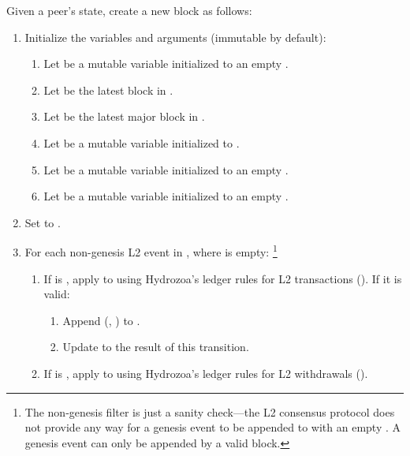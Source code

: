 \documentclass[../hydrozoa.tex]{subfiles}
\begin{document}
Given a peer's state, create a new block as follows:
\begin{enumerate}
  \item Initialize the variables and arguments (immutable by default):
    \begin{enumerate}
      \item Let  be a mutable variable initialized to an empty .
      \item Let  be the latest block in .
      \item Let  be the latest major block in .
      \item Let  be a mutable variable initialized to .
      \item Let  be a mutable variable initialized to an empty .
      \item Let  be a mutable variable initialized to an empty .
    \end{enumerate}
  \item Set  to .
  \item For each non-genesis L2 event  in , where  is empty:%
    \footnote{The non-genesis filter is just a sanity check---the L2 consensus protocol does not provide any way for a genesis event to be appended to  with an empty .
      A genesis event can only be appended by a valid block.
      }
      \begin{enumerate}
        \item If  is , apply  to  using Hydrozoa's ledger rules for L2 transactions ().
          If it is valid:
          \begin{enumerate}
            \item Append (, ) to .
            \item Update  to the result of this transition.
          \end{enumerate}
        \item If  is , apply  to  using Hydrozoa's ledger rules for L2 withdrawals ().

\end{enumerate}
\end{enumerate}
\end{document}
